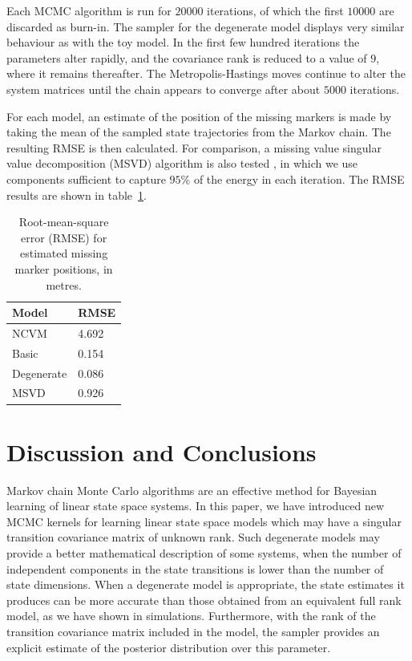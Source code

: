\documentclass[journal,10pt]{IEEEtran}
\begin{document}
Each MCMC algorithm is run for $20000$ iterations, of which the first $10000$ are discarded as burn-in. The sampler for the degenerate model displays very similar behaviour as with the toy model. In the first few hundred iterations the parameters alter rapidly, and the covariance rank is reduced to a value of $9$, where it remains thereafter. The Metropolis-Hastings moves continue to alter the system matrices until the chain appears to converge after about $5000$ iterations.

For each model, an estimate of the position of the missing markers is made by taking the mean of the sampled state trajectories from the Markov chain. The resulting RMSE is then calculated. For comparison, a missing value singular value decomposition (MSVD) algorithm is also tested \cite{Srebro2003,Liu2006,Li2009}, in which we use components sufficient to capture $95\%$ of the energy in each iteration. The RMSE results are shown in table~\ref{tab:mocap-rmse}.

\begin{table}
 \centering
 \begin{tabular}{l|l}
  Model          & RMSE \\
  \hline
  NCVM           & 4.692 \\
  Basic          & 0.154 \\
  Degenerate     & 0.086 \\
  MSVD           & 0.926
 \end{tabular}
 \caption{Root-mean-square error (RMSE) for estimated missing marker positions, in metres.}
 \label{tab:mocap-rmse}
\end{table}



\section{Discussion and Conclusions}

Markov chain Monte Carlo algorithms are an effective method for Bayesian learning of linear state space systems. In this paper, we have introduced new MCMC kernels for learning linear state space models which may have a singular transition covariance matrix of unknown rank. Such degenerate models may provide a better mathematical description of some systems, when the number of independent components in the state transitions is lower than the number of state dimensions. When a degenerate model is appropriate, the state estimates it produces can be more accurate than those obtained from an equivalent full rank model, as we have shown in simulations. Furthermore, with the rank of the transition covariance matrix included in the model, the sampler provides an explicit estimate of the posterior distribution over this parameter.
\end{document}
